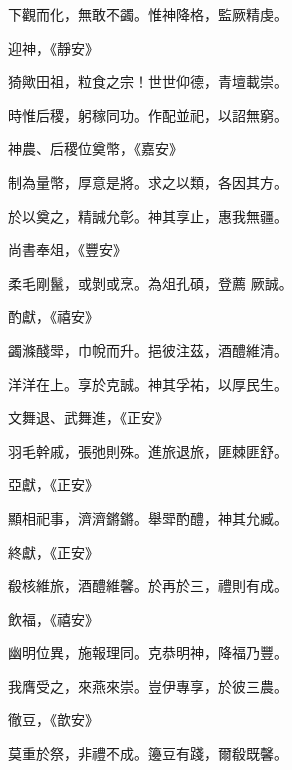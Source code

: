 \begin{pinyinscope}
 下觀而化，無敢不蠲。惟神降格，監厥精虔。



 迎神，《靜安》



 猗歟田祖，粒食之宗！世世仰德，青壇載崇。



 時惟后稷，躬稼同功。作配並祀，以詔無窮。



 神農、后稷位奠幣，《嘉安》



 制為量幣，厚意是將。求之以類，各因其方。



 於以奠之，精誠允彰。神其享止，惠我無疆。



 尚書奉俎，《豐安》



 柔毛剛鬣，或剝或烹。為俎孔碩，登薦
 厥誠。



 酌獻，《禧安》



 蠲滌醆斝，巾帨而升。挹彼注茲，酒醴維清。



 洋洋在上。享於克誠。神其孚祐，以厚民生。



 文舞退、武舞進，《正安》



 羽毛幹戚，張弛則殊。進旅退旅，匪棘匪舒。



 亞獻，《正安》



 顯相祀事，濟濟鏘鏘。舉斝酌醴，神其允臧。



 終獻，《正安》



 殽核維旅，酒醴維馨。於再於三，禮則有成。



 飲福，《禧安》



 幽明位異，施報理同。克恭明神，降福乃豐。



 我膺受之，來燕來崇。豈伊專享，於彼三農。



 徹豆，《歆安》



 莫重於祭，非禮不成。籩豆有踐，爾殽既馨。




\end{pinyinscope}
